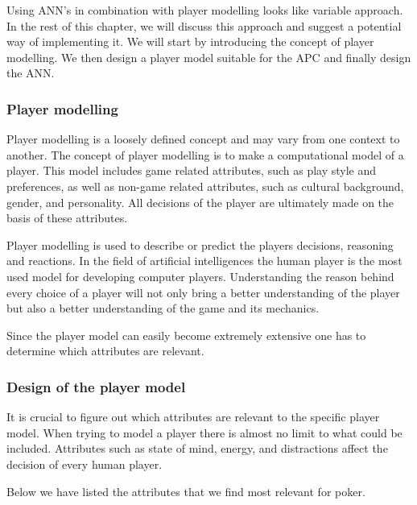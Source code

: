 Using ANN's in combination with player modelling looks like variable approach. In the rest of this chapter, we will discuss this approach and suggest a potential way of implementing it. We will start by introducing the concept of player modelling. We then design a player model suitable for the APC and finally design the ANN.

\subsubsection{Player modelling}
\label{sec:pm}
Player modelling is a loosely defined concept and may vary from one context to another. The concept of player modelling is to make a computational model of a player. This model includes game related attributes, such as play style and preferences, as well as non-game related attributes, such as cultural background, gender, and personality. All decisions of the player are ultimately made on the basis of these attributes. 

Player modelling is used to describe or predict the players decisions, reasoning and reactions. In the field of artificial intelligences the human player is the most used model for developing computer players. Understanding the reason behind every choice of a player will not only bring a better understanding of the player but also a better understanding of the game and its mechanics.

Since the player model can easily become extremely extensive one has to determine which attributes are relevant.

\subsubsection{Design of the player model}
It is crucial to figure out which attributes are relevant to the specific player model. When trying to model a player there is almost no limit to what could be included. Attributes such as state of mind, energy, and distractions affect the decision of every human player.  

Below we have listed the attributes that we find most relevant for poker.

